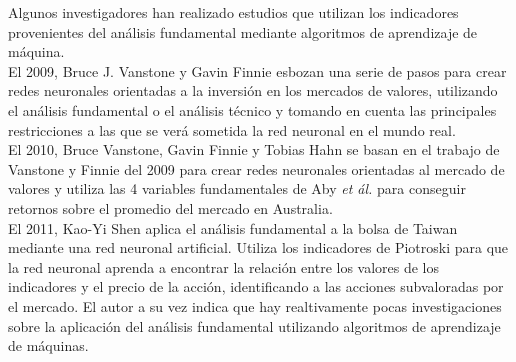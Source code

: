 Algunos investigadores han realizado estudios que utilizan los indicadores provenientes del análisis fundamental mediante algoritmos de aprendizaje de máquina.\\

El 2009, Bruce J. Vanstone y Gavin Finnie \cite{Vanstone2009} esbozan una serie de pasos para crear redes neuronales orientadas a la inversión en los mercados de valores, utilizando el análisis fundamental o el análisis técnico y tomando en cuenta las principales restricciones a las que se verá sometida la red neuronal en el mundo real.\\

El 2010, Bruce Vanstone, Gavin Finnie y Tobias Hahn \cite{Vanstone2010} se basan en el trabajo de Vanstone y Finnie del 2009 \cite{Vanstone2009} para crear redes neuronales orientadas al mercado de valores y utiliza las 4 variables fundamentales de Aby \textit{et ál.} \cite{Aby2001} para conseguir retornos sobre el promedio del mercado en Australia.\\

El 2011, Kao-Yi Shen \cite{Shen2011} aplica el an\'alisis fundamental a la bolsa de Taiwan mediante una red neuronal artificial. Utiliza los indicadores de Piotroski \cite{Piotroski2000} para que la red neuronal aprenda a encontrar la relación entre los valores de los indicadores y el precio de la acción, identificando a las acciones subvaloradas por el mercado. El autor a su vez indica que hay realtivamente pocas investigaciones sobre la aplicaci\'on del an\'alisis fundamental utilizando algoritmos de aprendizaje de m\'aquinas.\\


